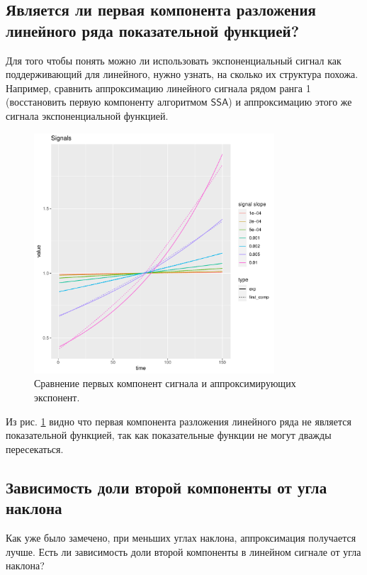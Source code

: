 \documentclass[specialist, substylefile = spbureport.rtx,
    subf,href,colorlinks=true, 12pt]{disser}
\newcommand{\SSA}{\mathsf{SSA}}
\begin{document}
    \subsection{Является ли первая компонента разложения линейного ряда показательной функцией?}
        Для того чтобы понять можно ли использовать экспоненциальный сигнал как поддерживающий для линейного, нужно узнать, на сколько их структура похожа. Например, сравнить аппроксимацию линейного сигнала рядом ранга 1 (восстановить первую компоненту алгоритмом $\SSA$) и аппроксимацию этого же сигнала экспоненциальной функцией.

        \begin{figure}[h]
            \centering
            \includegraphics[width=0.8\textwidth]{experiment_3_linefirstcomp.pdf}
            \caption{Сравнение первых компонент сигнала и аппроксимирующих экспонент.}
            \label{fig:exp3_linefirstcomp}
        \end{figure}

        Из рис. \ref{fig:exp3_linefirstcomp} видно что первая компонента разложения линейного ряда не является показательной функцией, так как показательные функции не могут дважды пересекаться.

    \subsection{Зависимость доли второй компоненты от угла наклона}

        Как уже было замечено, при меньших углах наклона, аппроксимация получается лучше. Есть ли зависимость доли второй компоненты в линейном сигнале от угла наклона?
\end{document}
